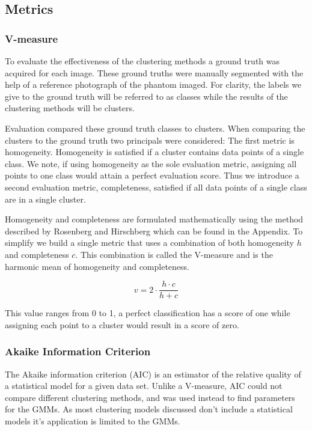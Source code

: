 \documentclass[a4paper,11pt]{article}
\begin{document}
\subsection{Metrics}
\subsubsection{V-measure}

To evaluate the effectiveness of the clustering methods a ground truth was acquired for each image. These ground truths were manually segmented with the help of a reference photograph of the phantom imaged. For clarity, the labels we give to the ground truth will be referred to as classes while the results of the clustering methods will be clusters.

Evaluation compared these ground truth classes to clusters. When comparing the clusters to the ground truth two principals were considered: The first metric is homogeneity. Homogeneity is satisfied if a cluster contains data points of a single class. We note, if using homogeneity as the sole evaluation metric, assigning all points to one class would attain a perfect evaluation score. Thus we introduce a second evaluation metric, completeness, satisfied if all data points of a single class are in a single cluster. 

Homogeneity and completeness are formulated mathematically using the method described by Rosenberg and Hirschberg \cite{Rosenberg2007V-Measure:Measure} which can be found in the Appendix. To simplify we build a single metric that uses a combination of both homogeneity $h$ and completeness $c$. This combination is called the V-measure and is the harmonic mean of homogeneity and completeness.


\begin{equation}
v = 2 \cdot \frac{h \cdot c}{h + c}
\end{equation}

This value ranges from 0 to 1, a perfect classification has a score of one while assigning each point to a cluster would result in a score of zero.

\subsubsection{Akaike Information Criterion}

The Akaike information criterion (AIC) \cite{Akaike1998InformationPrinciple} is an estimator of the relative quality of a statistical model for a given data set. Unlike a V-measure, AIC could not compare different clustering methods, and was used instead to find parameters for the GMMs. As most clustering models discussed don't include a statistical models it's application is limited to the GMMs.
\end{document}
